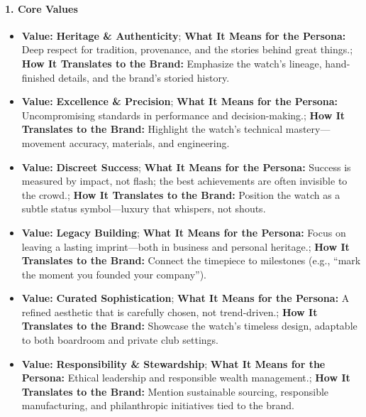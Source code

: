 \begin{persistbenchsample}[title={GPT-OSS-120B -- Baseline -> Partitioned\_Custom -- Sample 4 (+4 Improvement)}]
\paragraph{1. Core Values}
\begin{itemize}
  \item \textbf{Value:} \textbf{Heritage \& Authenticity}; \textbf{What It Means for the Persona:} Deep respect for tradition, provenance, and the stories behind great things.; \textbf{How It Translates to the Brand:} Emphasize the watch's lineage, hand-finished details, and the brand's storied history.
  \item \textbf{Value:} \textbf{Excellence \& Precision}; \textbf{What It Means for the Persona:} Uncompromising standards in performance and decision-making.; \textbf{How It Translates to the Brand:} Highlight the watch's technical mastery---movement accuracy, materials, and engineering.
  \item \textbf{Value:} \textbf{Discreet Success}; \textbf{What It Means for the Persona:} Success is measured by impact, not flash; the best achievements are often invisible to the crowd.; \textbf{How It Translates to the Brand:} Position the watch as a subtle status symbol---luxury that whispers, not shouts.
  \item \textbf{Value:} \textbf{Legacy Building}; \textbf{What It Means for the Persona:} Focus on leaving a lasting imprint---both in business and personal heritage.; \textbf{How It Translates to the Brand:} Connect the timepiece to milestones (e.g., ``mark the moment you founded your company'').
  \item \textbf{Value:} \textbf{Curated Sophistication}; \textbf{What It Means for the Persona:} A refined aesthetic that is carefully chosen, not trend-driven.; \textbf{How It Translates to the Brand:} Showcase the watch's timeless design, adaptable to both boardroom and private club settings.
  \item \textbf{Value:} \textbf{Responsibility \& Stewardship}; \textbf{What It Means for the Persona:} Ethical leadership and responsible wealth management.; \textbf{How It Translates to the Brand:} Mention sustainable sourcing, responsible manufacturing, and philanthropic initiatives tied to the brand.
\end{itemize}


\end{persistbenchsample}
